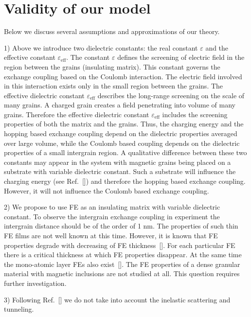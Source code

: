 \documentclass[aps,prb,amsmath,amssymb,twocolumn,superscriptaddress,showpacs,floatfix]{revtex4-1}
\begin{document}
\section{Validity of our model}\label{Sec:Val}


Below we discuss several assumptions and approximations of our theory.

1) Above we introduce two dielectric constants:
the real constant $\varepsilon$ and the effective constant $\varepsilon_\mathrm{eff}$.
The constant $\varepsilon$ defines the screening of electric field
in the region between the grains (insulating matrix). This constant
governs the exchange coupling based on the Coulomb interaction.
The electric field involved in this interaction exists
only in the small region between the grains. The effective
dielectric constant $\varepsilon_\mathrm{eff}$ describes the
long-range screening on the scale of many grains. A charged
grain creates a field penetrating into volume of many grains.
Therefore the effective dielectric constant $\varepsilon_\mathrm{eff}$
includes the screening properties of both the matrix and the grains.
Thus, the charging energy and the hopping based exchange coupling
depend on the dielectric properties averaged over large volume,
while the Coulomb based coupling depends on the dielectric
properties of a small intergrain region. A qualitative difference
between these two constants may appear in the system
with magnetic grains being placed on a substrate with variable
dielectric constant. Such a substrate will influence the charging
energy (see Ref.~[])
and therefore the hopping based exchange coupling. However,
it will not influence the Coulomb based exchange coupling.

2) We propose to use FE as an insulating matrix with variable
dielectric constant. To observe the intergrain exchange coupling
in experiment the intergrain distance should be of the
order of 1 nm. The properties of such thin FE films are not
well known at this time. However, it is known that
FE properties degrade with decreasing of FE thickness~[].
For each particular FE there is a critical thickness at which FE properties disappear.
At the same time the mono-atomic layer FEs also exist~[].
The FE properties of a dense granular material with magnetic inclusions
are not studied at all. This question requires further investigation.

3) Following Ref.~[] we do not take into account the inelastic scattering and tunneling.
\end{document}
